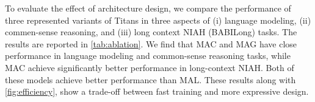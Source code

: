 

To evaluate the effect of architecture design, we compare the performance of three represented variants of Titans in three aspects of (i) language modeling, (ii) commen-sense reasoning, and (iii) long context NIAH (BABILong) tasks. The results are reported in \autoref{tab:ablation}. We find that MAC and MAG have close performance in language modeling and common-sense reasoning tasks, while MAC achieve significantly better performance in long-context NIAH. Both of these models achieve better performance than MAL. These results along with \autoref{fig:efficiency}, show a trade-off between fast training and more expressive design.  